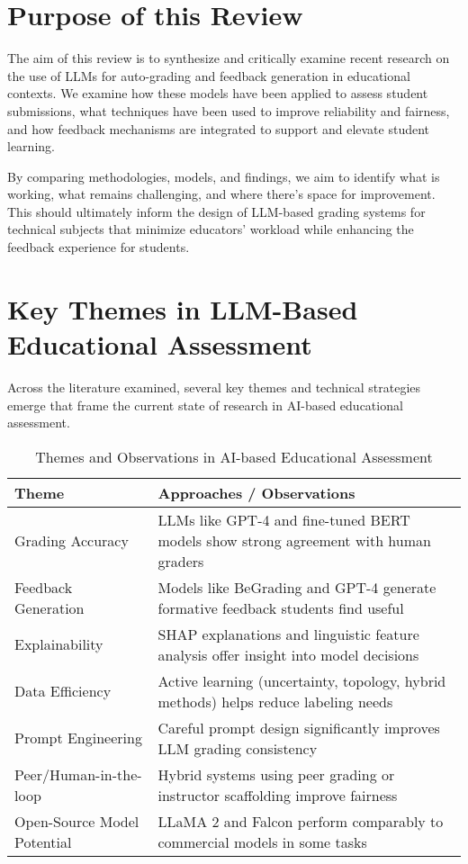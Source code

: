 \section{Purpose of this Review}
The aim of this review is to synthesize and critically examine recent research on the use of LLMs for auto-grading and feedback generation in educational contexts. We examine how these models have been applied to assess student submissions, what techniques have been used to improve reliability and fairness, and how feedback mechanisms are integrated to support and elevate student learning.

By comparing methodologies, models, and findings, we aim to identify what is working, what remains challenging, and where there's space for improvement. This should ultimately inform the design of LLM-based grading systems for technical subjects that minimize educators' workload while enhancing the feedback experience for students.

\section{Key Themes in LLM-Based Educational Assessment}
Across the literature examined, several key themes and technical strategies emerge that frame the current state of research in AI-based educational assessment.

\begin{table}[h]
  \centering
  \caption{Themes and Observations in AI-based Educational Assessment}
  \label{tab:grading_ai_themes}
  \begin{tabular}{@{}p{5cm}p{11cm}@{}}
  \toprule
  \textbf{Theme} & \textbf{Approaches / Observations} \\
  \midrule
  Grading Accuracy & LLMs like GPT-4 and fine-tuned BERT models show strong agreement with human graders \citep{impey2024} \\
  \midrule
  Feedback Generation & Models like BeGrading and GPT-4 generate formative feedback students find useful \citep{polikar2025} \\
  \midrule
  Explainability & SHAP explanations and linguistic feature analysis offer insight into model decisions \citep{mok2023} \\
  \midrule
  Data Efficiency & Active learning (uncertainty, topology, hybrid methods) helps reduce labeling needs \citep{firoozi2023} \\
  \midrule
  Prompt Engineering & Careful prompt design significantly improves LLM grading consistency \citep{bengtsson2024} \\
  \midrule
  Peer/Human-in-the-loop & Hybrid systems using peer grading or instructor scaffolding improve fairness \citep{impey2024} \\
  \midrule
  Open-Source Model Potential & LLaMA 2 and Falcon perform comparably to commercial models in some tasks \citep{polikar2025} \\
  \bottomrule
  \end{tabular}
\end{table}

